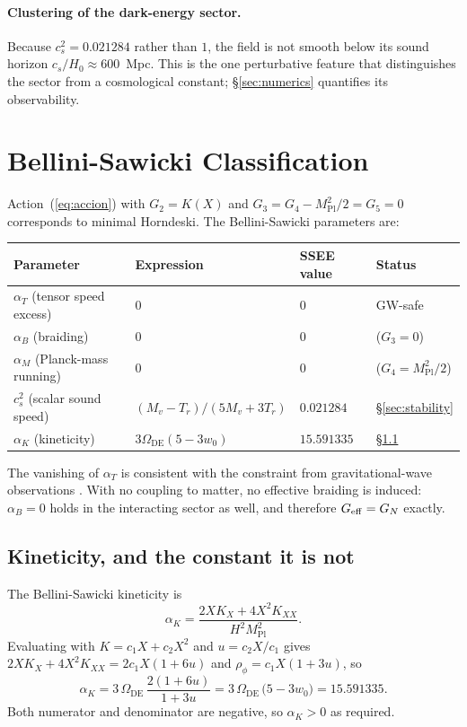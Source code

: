 \documentclass[12pt,a4paper]{article}
\newcommand{\Mpl}{M_{\mathrm{Pl}}}
\newcommand{\Omde}{\Omega_{\mathrm{DE}}}
\begin{document}
\paragraph{Clustering of the dark-energy sector.}
Because $c_s^2 = 0.021284$ rather than $1$, the field is not smooth below
its sound horizon $c_s/H_0 \approx 600$~Mpc.  This is the one
perturbative feature that distinguishes the sector from a cosmological
constant; §\ref{sec:numerics} quantifies its observability.
\section{Bellini-Sawicki Classification}
\label{sec:bellini}

Action~(\ref{eq:accion}) with $G_2 = K(X)$ and
$G_3 = G_4 - \Mpl^2/2 = G_5 = 0$ corresponds to minimal Horndeski.
The Bellini-Sawicki parameters \citep{bellini2014} are:

\begin{center}
\begin{tabular}{llll}
\toprule
Parameter & Expression & SSEE value & Status \\
\midrule
$\alpha_T$ (tensor speed excess)  & $0$ & $0$ & GW-safe \\
$\alpha_B$ (braiding)             & $0$ & $0$ & ($G_3 = 0$) \\
$\alpha_M$ (Planck-mass running)  & $0$ & $0$ & ($G_4 = \Mpl^2/2$) \\
$c_s^2$ (scalar sound speed)     & $(M_v-T_r)/(5M_v+3T_r)$ & $0.021284$ & §\ref{sec:stability} \\
$\alpha_K$ (kineticity)          & $3\Omde(5-3w_0)$ & $15.591335$ & §\ref{sec:alphak} \\
\bottomrule
\end{tabular}
\end{center}

The vanishing of $\alpha_T$ is consistent with the constraint from
gravitational-wave observations \citep{gw170817_2017}.  With no coupling
to matter, no effective braiding is induced: $\alpha_B = 0$ holds in the
interacting sector as well, and therefore $G_{\rm eff} = G_N$ exactly.

\subsection{Kineticity, and the constant it is not}
\label{sec:alphak}

The Bellini-Sawicki kineticity is
%
\begin{equation}
  \alpha_K = \frac{2XK_X + 4X^2K_{XX}}{H^2\Mpl^2}.
  \label{eq:alphak_raw}
\end{equation}
%
Evaluating with $K = c_1X + c_2X^2$ and $u = c_2X/c_1$ gives
$2XK_X+4X^2K_{XX} = 2c_1X(1+6u)$ and $\rho_\phi = c_1X(1+3u)$, so
%
\begin{equation}
  \boxed{\alpha_K = 3\,\Omde\,\frac{2(1+6u)}{1+3u}
                  = 3\,\Omde\,\bigl(5-3w_0\bigr)
                  = 15.591335.}
  \label{eq:alphak}
\end{equation}
%
Both numerator and denominator are negative, so $\alpha_K > 0$ as
required.
\end{document}
